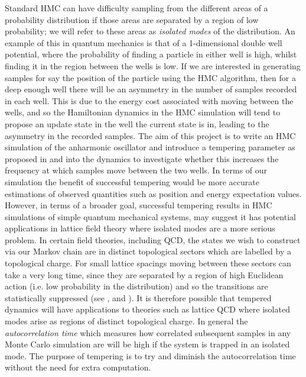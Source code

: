 \documentclass[12pt]{article}
\begin{document}
 Standard HMC can have difficulty sampling from the different areas of a probability distribution if those areas are separated by a region of low probability; we will refer to these areas as \textit{isolated modes} of the distribution. An example of this in quantum mechanics is that of a 1-dimensional double well potential, where the probability of finding a particle in either well is high, whilst finding it in the region between the wells is low. If we are interested in generating samples for say the position of the particle using the HMC algorithm, then for a deep enough well there will be an asymmetry in the number of samples recorded in each well. This is due to the energy cost associated with moving between the wells, and so the Hamiltonian dynamics in the HMC simulation will tend to propose an update state in the well the current state is in, leading to the asymmetry in the recorded samples. The aim of this project is to write an HMC simulation of the anharmonic oscillator and introduce a tempering parameter as proposed in \cite{neal_1996_b} and \cite{neal_2011} into the dynamics to investigate whether this increases the frequency at which samples move between the two wells. In terms of our simulation the benefit of successful tempering would be more accurate estimations of observed quantities such as position and energy expectation values. However, in terms of a broader goal, successful tempering results in HMC simulations of simple quantum mechanical systems, may suggest it has potential applications in lattice field theory where isolated modes are a more serious problem. In certain field theories, including QCD, the states we wish to construct via our Markov chain are in distinct topological sectors which are labelled by a topological charge. For small lattice spacings moving between these sectors can take a very long time, since they are separated by a region of high Euclidean action (i.e. low probability in the distribution) and so the transitions are statistically suppressed (see \cite{bietenholz_2016}, \cite{debbio_panagopoulos_vicari_2002} and \cite{debbio_manca_vicari_2004}). It is therefore possible that tempered dynamics will have applications to theories such as lattice QCD where isolated modes arise as regions of distinct topological charge. In general the \textit{autocorrelation time} which measures how correlated subsequent samples in any Monte Carlo simulation are will be high if the system is trapped in an isolated mode. The purpose of tempering is to try and diminish the autocorrelation time without the need for extra computation. 
\end{document}
